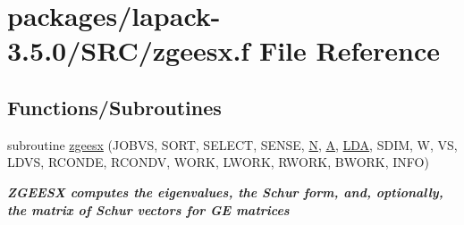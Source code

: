 \hypertarget{zgeesx_8f}{}\section{packages/lapack-\/3.5.0/\+S\+R\+C/zgeesx.f File Reference}
\label{zgeesx_8f}
\subsection*{Functions/\+Subroutines}
\begin{DoxyCompactItemize}
\item 
subroutine \hyperlink{group__complex16GEeigen_ga5b71a5031d2efac59c8f97c707407f65}{zgeesx} (J\+O\+B\+V\+S, S\+O\+R\+T, S\+E\+L\+E\+C\+T, S\+E\+N\+S\+E, \hyperlink{polmisc_8c_a0240ac851181b84ac374872dc5434ee4}{N}, \hyperlink{classA}{A}, \hyperlink{example__user_8c_ae946da542ce0db94dced19b2ecefd1aa}{L\+D\+A}, S\+D\+I\+M, W, V\+S, L\+D\+V\+S, R\+C\+O\+N\+D\+E, R\+C\+O\+N\+D\+V, W\+O\+R\+K, L\+W\+O\+R\+K, R\+W\+O\+R\+K, B\+W\+O\+R\+K, I\+N\+F\+O)
\begin{DoxyCompactList}\small\item\em {\bfseries  Z\+G\+E\+E\+S\+X computes the eigenvalues, the Schur form, and, optionally, the matrix of Schur vectors for G\+E matrices} \end{DoxyCompactList}\end{DoxyCompactItemize}
